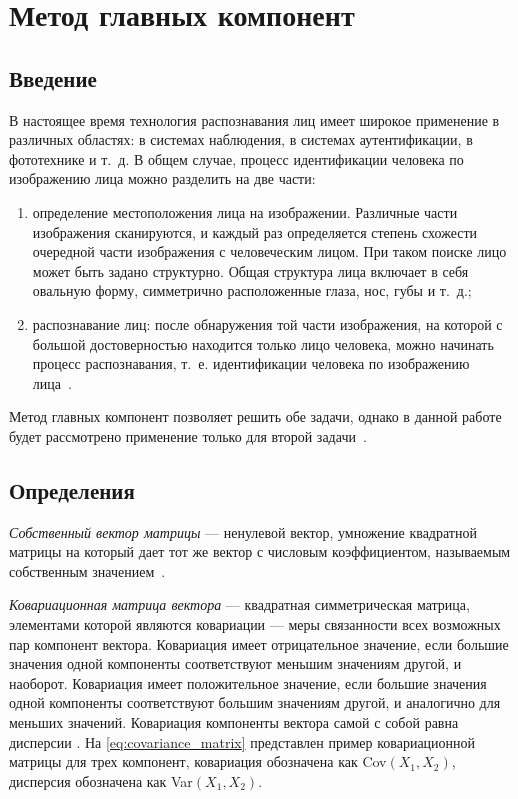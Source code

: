 \chapter{Метод главных компонент}
\section{Введение}

В настоящее время технология распознавания лиц имеет широкое применение в различных областях: в системах наблюдения, в системах аутентификации, в фототехнике и т.~д. В общем случае, процесс идентификации человека по изображению лица можно разделить на две части:
\begin{enumerate}
	\item определение местоположения лица на изображении. Различные части изображения сканируются, и каждый раз определяется степень схожести очередной части изображения с человеческим лицом.  При таком поиске лицо может быть задано структурно. Общая структура лица включает в себя овальную форму, симметрично расположенные глаза, нос, губы и т.~д.;
	\item распознавание лиц: после обнаружения той части изображения, на которой с большой достоверностью находится только лицо человека, можно начинать процесс распознавания, т.~е. идентификации человека по изображению лица~\cite{ieee}.
\end{enumerate}

Метод главных компонент позволяет решить обе задачи, однако в данной работе  будет рассмотрено применение только для второй задачи~\cite{brilyuk}.

\section{Определения}

\textit{Собственный вектор матрицы} --- ненулевой вектор, умножение квадратной матрицы на который дает тот же вектор с числовым коэффициентом, называемым собственным значением~\cite{linal}.

\textit{Ковариационная матрица вектора} --- квадратная симметрическая матрица, элементами которой являются ковариации --- меры связанности всех возможных пар компонент вектора. Ковариация имеет отрицательное значение, если большие значения одной компоненты соответствуют меньшим значениям другой, и наоборот. Ковариация имеет положительное значение, если большие значения одной компоненты соответствуют большим значениям другой, и аналогично для меньших значений. Ковариация компоненты вектора самой с собой равна дисперсии \cite{teorver}. На \eqref{eq:covariance_matrix} представлен пример ковариационной матрицы для трех компонент, ковариация обозначена как Cov$(X_1, X_2)$, дисперсия обозначена как Var$(X_1, X_2)$.


